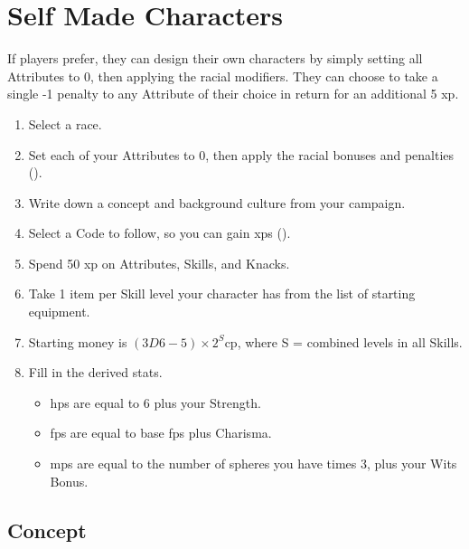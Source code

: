 \section{Self Made Characters}

\begin{multicols}{2}

\label{playerchosen}

If players prefer, they can design their own characters by simply setting all Attributes to 0, then applying the racial modifiers.
They can choose to take a single -1 penalty to any Attribute of their choice in return for an additional 5 \gls{xp}.

\begin{enumerate}
  \item\label{sumCCrace}
  Select a race.
  \item\label{sumCCatt}
  Set each of your Attributes to 0, then apply the racial bonuses and penalties ().
  \item\label{sumCCconcept}
  Write down a concept and background culture from your campaign.
  \item\label{sumCCcode}
  Select a Code to follow, so you can gain \glspl{xp} ().
  \item\label{sumCCxp}
  Spend 50 \gls{xp} on Attributes, Skills, and Knacks\iftoggle{core}{ (Core rules, \autopageref{knacks}.)}{}.
  \item\label{sumCCequip}
  Take 1 item per Skill level your character has from the list of starting equipment.
  \item\label{sumCCcoin}
  Starting money is $(3D6-5)\times 2^S$\gls{cp}, where S = combined levels in all Skills.
  \item
  Fill in the derived stats.
  \begin{itemize}

    \item
    \glspl{hp} are equal to 6 plus your Strength.
    \item
    \glspl{fp} are equal to base \glspl{fp} plus Charisma.
    \item
    \glspl{mp} are equal to the number of spheres you have times 3, plus your Wits Bonus.

  \end{itemize}
\end{enumerate}

\subsection{Concept}


\end{multicols}
